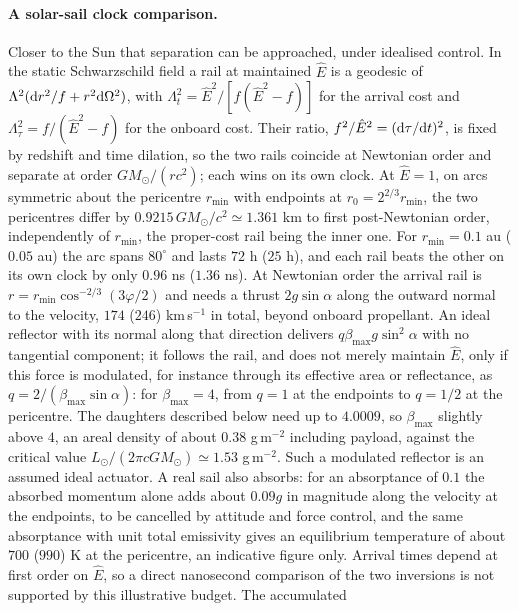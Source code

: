 \documentclass[12pt]{iopart}
\theoremstyle{plain}
\theoremstyle{definition}
\theoremstyle{remark}
\newcommand{\Ehat}{\hat E}
\begin{document}
\paragraph{A solar-sail clock comparison.}
\label{par:obs-sail}
Closer to the Sun that separation can be approached, under idealised control. In the
static Schwarzschild field a rail at maintained $\Ehat$ is a geodesic of
$\Lambda^2({\rm d}r^2/f+r^2{\rm d}\Omega^2)$, with $\Lambda_t^2=\Ehat^2/[f(\Ehat^2-f)]$
for the arrival cost and $\Lambda_\tau^2=f/(\Ehat^2-f)$ for the onboard cost. Their
ratio, $f^2/\Ehat^2=({\rm d}\tau/{\rm d}t)^2$, is fixed by redshift and time dilation,
so the two rails coincide at Newtonian order and separate at order $GM_\odot/(rc^2)$;
each wins on its own clock. At $\Ehat=1$, on arcs symmetric about the pericentre
$r_{\min}$ with endpoints at $r_0=2^{2/3}r_{\min}$, the two pericentres differ by
$0.9215\,GM_\odot/c^2\simeq1.361$ km to first post-Newtonian order, independently of
$r_{\min}$, the proper-cost rail being the inner one. For $r_{\min}=0.1$ au
($0.05$ au) the arc spans $80^\circ$ and lasts $72$ h ($25$ h), and each rail beats
the other on its own clock by only $0.96$ ns ($1.36$ ns). At Newtonian order the
arrival rail is $r=r_{\min}\cos^{-2/3}(3\varphi/2)$ and needs a thrust $2g\sin\alpha$
along the outward normal to the velocity, $174$ ($246$) km\,s$^{-1}$ in total, beyond
onboard propellant. An ideal reflector with its normal along that direction delivers
$q\beta_{\max}g\sin^2\alpha$ with no tangential component; it follows the rail, and does
not merely maintain $\Ehat$, only if this force is modulated, for instance through its
effective area or reflectance, as $q=2/(\beta_{\max}\sin\alpha)$: for $\beta_{\max}=4$,
from $q=1$ at the endpoints to $q=1/2$ at the pericentre. The daughters described below
need up to $4.0009$, so $\beta_{\max}$ slightly above $4$, an areal density of about
$0.38$ g\,m$^{-2}$ including payload, against the critical value
$L_\odot/(2\pi cGM_\odot)\simeq1.53$ g\,m$^{-2}$. Such a modulated reflector is an
assumed ideal actuator. A real sail also absorbs: for an absorptance of $0.1$ the
absorbed momentum alone adds about $0.09g$ in magnitude along the velocity at the endpoints, to be
cancelled by attitude and force control, and the same absorptance with unit total
emissivity gives an equilibrium temperature of about $700$ ($990$) K at the
pericentre, an indicative figure only.
Arrival times depend at first order on $\Ehat$, so a direct nanosecond comparison of
the two inversions is not supported by this illustrative budget. The accumulated
\end{document}
